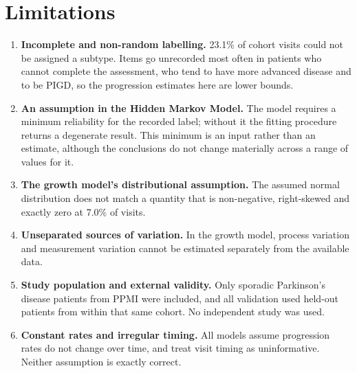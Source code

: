 \documentclass[11pt,a4paper]{article}
\begin{document}
\section{Limitations}

\begin{enumerate}[leftmargin=2.2em]
  \item \textbf{Incomplete and non-random labelling.} 23.1\% of cohort visits
        could not be assigned a subtype. Items go unrecorded most often in
        patients who cannot complete the assessment, who tend to have more
        advanced disease and to be PIGD, so the progression estimates here are
        lower bounds.

  \item \textbf{An assumption in the Hidden Markov Model.} The model requires a
        minimum reliability for the recorded label; without it the fitting
        procedure returns a degenerate result. This minimum is an input rather
        than an estimate, although the conclusions do not change materially
        across a range of values for it.

  \item \textbf{The growth model's distributional assumption.} The assumed
        normal distribution does not match a quantity that is non-negative,
        right-skewed and exactly zero at 7.0\% of visits.

  \item \textbf{Unseparated sources of variation.} In the growth model, process
        variation and measurement variation cannot be estimated separately from
        the available data.

  \item \textbf{Study population and external validity.} Only sporadic
        Parkinson's disease patients from PPMI were included, and all validation
        used held-out patients from within that same cohort. No independent
        study was used.

  \item \textbf{Constant rates and irregular timing.} All models assume
        progression rates do not change over time, and treat visit timing as
        uninformative. Neither assumption is exactly correct.
\end{enumerate}

\end{document}

